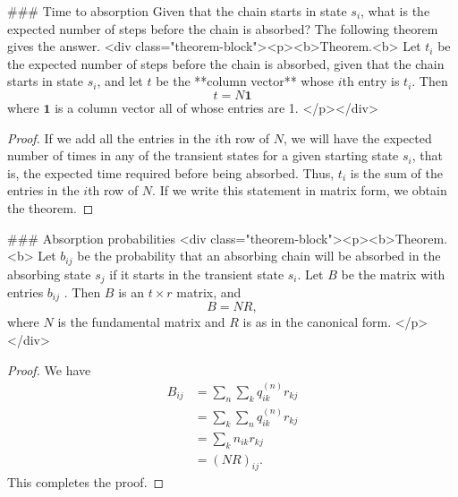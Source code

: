 ### Time to absorption
Given that the chain starts in state $s_i$, what is the expected number of steps before the chain is absorbed? The following theorem gives the answer.
<div class="theorem-block"><p><b>Theorem.<b> 
Let $t_i$ be the expected number of steps before the chain is absorbed, given that the chain starts in state $s_i$, and let $t$ be the **column vector** whose $i$th entry is $t_i$. Then
$$\begin{equation}
    t = N \mathbf{1}
\end{equation}$$
where $\mathbf{1}$ is a column vector all of whose entries are 1.
</p></div>

\begin{proof}
If we add all the entries in the $i$th row of $N$, we will have the expected number of times in any of the transient states for a given starting state $s_i$, that is, the expected time required before being absorbed. Thus, $t_i$ is the sum of the entries in the $i$th row of $N$. If we write this statement in matrix form, we obtain the theorem.
\end{proof}

### Absorption probabilities
<div class="theorem-block"><p><b>Theorem.<b> 
Let $b_{ij}$ be the probability that an absorbing chain will be absorbed in the absorbing state $s_j$ if it starts in the transient state $s_i$. Let $B$ be the matrix with entries $b_{ij}$ . Then $B$ is an $t\times r$ matrix, and
$$\begin{equation}
    B = NR,
\end{equation}$$
where $N$ is the fundamental matrix and $R$ is as in the canonical form.
</p></div>

\begin{proof}
We have 
$$\begin{equation}
    \begin{aligned} 
        B_{i j} &=\sum_{n} \sum_{k} q_{i k}^{(n)} r_{k j} \\ &=\sum_{k} \sum_{n} q_{i k}^{(n)} r_{k j} \\ &=\sum_{k} n_{i k} r_{k j} \\ &=(N R)_{i j}.
    \end{aligned}
\end{equation}$$
This completes the proof.
\end{proof}

